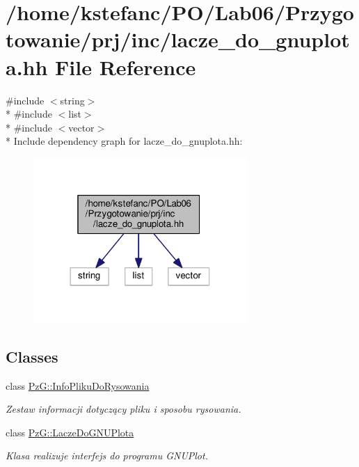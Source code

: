 \hypertarget{lacze__do__gnuplota_8hh}{\section{/home/kstefanc/\+P\+O/\+Lab06/\+Przygotowanie/prj/inc/lacze\+\_\+do\+\_\+gnuplota.hh File Reference}
\label{lacze__do__gnuplota_8hh}
}
{\ttfamily \#include $<$string$>$}\\*
{\ttfamily \#include $<$list$>$}\\*
{\ttfamily \#include $<$vector$>$}\\*
Include dependency graph for lacze\+\_\+do\+\_\+gnuplota.\+hh\+:\nopagebreak
\begin{figure}[H]
\begin{center}
\leavevmode
\includegraphics[width=230pt]{lacze__do__gnuplota_8hh__incl}
\end{center}
\end{figure}
\subsection*{Classes}
\begin{DoxyCompactItemize}
\item 
class \hyperlink{class_pz_g_1_1_info_pliku_do_rysowania}{Pz\+G\+::\+Info\+Pliku\+Do\+Rysowania}
\begin{DoxyCompactList}\small\item\em Zestaw informacji dotyczący pliku i sposobu rysowania. \end{DoxyCompactList}\item 
class \hyperlink{class_pz_g_1_1_lacze_do_g_n_u_plota}{Pz\+G\+::\+Lacze\+Do\+G\+N\+U\+Plota}
\begin{DoxyCompactList}\small\item\em Klasa realizuje interfejs do programu G\+N\+U\+Plot. \end{DoxyCompactList}\end{DoxyCompactItemize}
